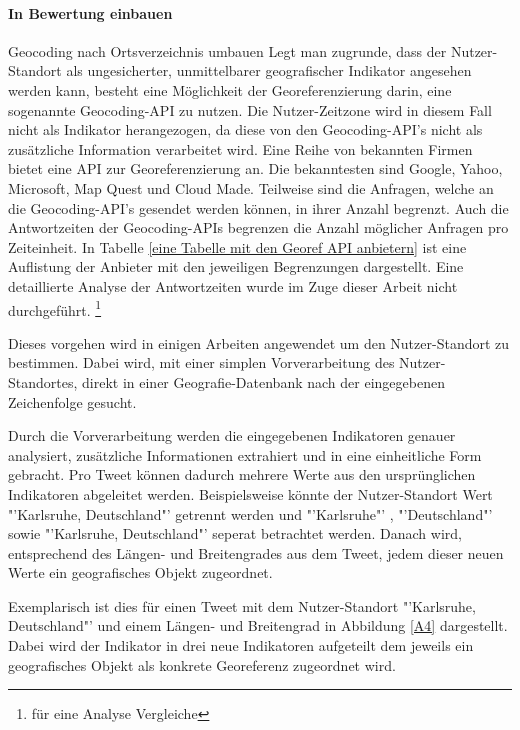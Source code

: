 	\paragraph{In Bewertung einbauen} 
	Geocoding nach Ortsverzeichnis umbauen
	Legt man zugrunde, dass der Nutzer-Standort als ungesicherter, unmittelbarer geografischer Indikator angesehen werden kann, besteht eine Möglichkeit der Georeferenzierung darin, eine sogenannte Geocoding-API zu nutzen.
	Die Nutzer-Zeitzone wird in diesem Fall nicht als Indikator herangezogen, da diese von den Geocoding-API's nicht als zusätzliche Information verarbeitet wird. 
	Eine Reihe von bekannten Firmen bietet eine API zur Georeferenzierung an. 
	Die bekanntesten sind Google, Yahoo, Microsoft, Map Quest und Cloud Made. 
	Teilweise sind die Anfragen, welche an die Geocoding-API's gesendet werden können, in ihrer Anzahl begrenzt.
	Auch die Antwortzeiten der Geocoding-APIs begrenzen die Anzahl möglicher Anfragen pro Zeiteinheit. 
	In Tabelle \ref{eine Tabelle mit den Georef API anbietern} ist eine Auflistung der Anbieter mit den jeweiligen Begrenzungen dargestellt.
	Eine detaillierte Analyse der Antwortzeiten wurde im Zuge dieser Arbeit nicht durchgeführt.  \footnote{für eine Analyse Vergleiche} 


	
	Dieses vorgehen wird in einigen Arbeiten angewendet um den Nutzer-Standort zu bestimmen. 
	Dabei wird, mit einer simplen Vorverarbeitung des Nutzer-Standortes, direkt in einer Geografie-Datenbank nach der eingegebenen Zeichenfolge gesucht. 

	Durch die Vorverarbeitung werden die eingegebenen Indikatoren genauer analysiert, zusätzliche Informationen extrahiert und in eine einheitliche Form gebracht.
	Pro Tweet können dadurch mehrere Werte aus den ursprünglichen Indikatoren abgeleitet werden.
	Beispielsweise könnte der Nutzer-Standort Wert "'Karlsruhe, Deutschland"' getrennt werden und "'Karlsruhe"' , "'Deutschland"' sowie "'Karlsruhe, Deutschland"' seperat betrachtet werden.  
	Danach wird, entsprechend des Längen- und Breitengrades aus dem Tweet, jedem dieser neuen Werte ein geografisches Objekt zugeordnet.

	Exemplarisch ist dies für einen Tweet mit dem Nutzer-Standort "'Karlsruhe, Deutschland"' und einem Längen- und Breitengrad in Abbildung \ref{A4} dargestellt.
	Dabei wird der Indikator in drei neue Indikatoren aufgeteilt dem jeweils ein geografisches Objekt als konkrete Georeferenz zugeordnet wird.
	
